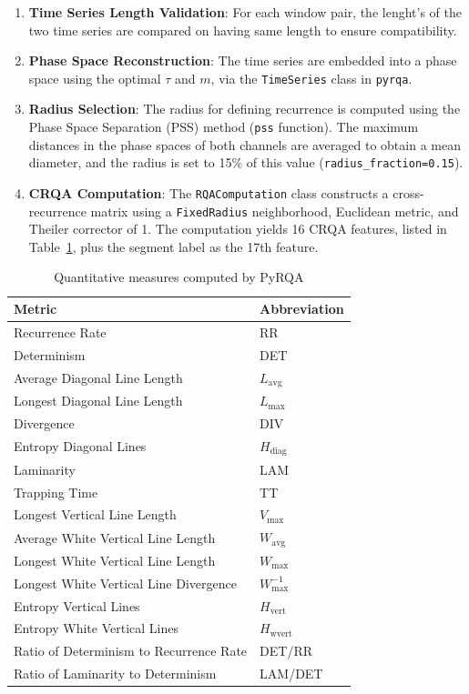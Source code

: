 \documentclass{article}
\begin{document}
				\begin{enumerate}
				    \item \textbf{Time Series Length Validation}: For each window pair, the lenght's of the two time series are compared on having same length to ensure compatibility.
				    \item \textbf{Phase Space Reconstruction}: The time series are embedded into a phase space using the optimal \(\tau\) and \(m\), via the \texttt{TimeSeries} class in \texttt{pyrqa}.
				    \item \textbf{Radius Selection}: The radius for defining recurrence is computed using the Phase Space Separation (PSS) method (\texttt{pss} function). The maximum distances in the phase spaces of both channels are averaged to obtain a mean diameter, and the radius is set to 15\% of this value (\texttt{radius\_fraction=0.15}).
				    \item \textbf{CRQA Computation}: The \texttt{RQAComputation} class constructs a cross-recurrence matrix using a \texttt{FixedRadius} neighborhood, Euclidean metric, and Theiler corrector of 1. The computation yields 16 CRQA features, listed in Table~\ref{tab:pyrqa_metrics}, plus the segment label as the 17th feature.
				\end{enumerate}

				\begin{table}[h]
				\centering
				\caption{Quantitative measures computed by PyRQA}
				\label{tab:pyrqa_metrics}
				\begin{tabular}{ll}
				\toprule
				\textbf{Metric} & \textbf{Abbreviation} \\
				\midrule
				Recurrence Rate & RR \\
				Determinism & DET \\
				Average Diagonal Line Length & \(L_{\text{avg}}\) \\
				Longest Diagonal Line Length & \(L_{\text{max}}\) \\
				Divergence & DIV \\
				Entropy Diagonal Lines & \(H_{\text{diag}}\) \\
				Laminarity & LAM \\
				Trapping Time & TT \\
				Longest Vertical Line Length & \(V_{\text{max}}\) \\
				Average White Vertical Line Length & \(W_{\text{avg}}\) \\
				Longest White Vertical Line Length & \(W_{\text{max}}\) \\
				Longest White Vertical Line Divergence & \(W_{\text{max}}^{-1}\) \\
				Entropy Vertical Lines & \(H_{\text{vert}}\) \\
				Entropy White Vertical Lines & \(H_{\text{wvert}}\) \\
				Ratio of Determinism to Recurrence Rate & DET/RR \\
				Ratio of Laminarity to Determinism & LAM/DET \\
				\bottomrule
				\end{tabular}
				\end{table}
\end{document}
